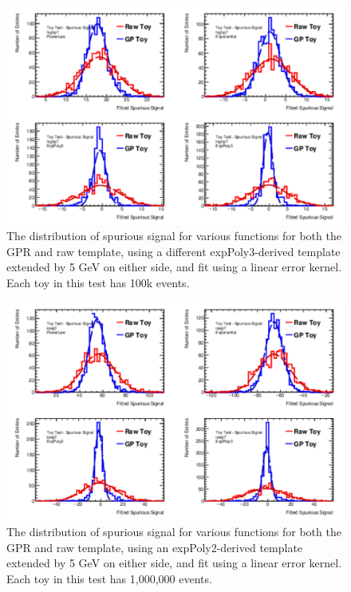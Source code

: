\begin{figure} 
\begin{center}
  \includegraphics[width=\textwidth]{figures/background/gpr/validation/linear/ToyTest_FitSigVals_highpT_100k_noSig}   
\caption{The distribution of spurious signal for various functions for both the GPR and raw template, using a different expPoly3-derived template extended by 5 GeV on either side, and fit using a linear error kernel. Each toy in this test has 100k events.}
\label{fig:linearkernel_highpt_100k_noSig}
\end{center}
\end{figure}

\begin{figure} 
\begin{center}
  \includegraphics[width=\textwidth]{figures/background/gpr/validation/linear/ToyTest_FitSigVals_lowpT_1M_noSig}   
\caption{The distribution of spurious signal for various functions for both the GPR and raw template, using an expPoly2-derived template extended by 5 GeV on either side, and fit using a linear error kernel. Each toy in this test has 1,000,000 events.}
\label{fig:linearkernel_lowpt_1M_noSig}
\end{center}
\end{figure}

